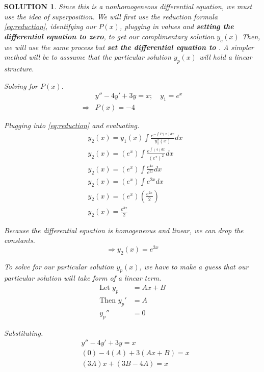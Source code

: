 \documentclass{article}
\theoremstyle{solution}
\newtheorem*{solution}{SOLUTION}
\theoremstyle{definition}
\begin{document}
\begin{solution}
    Since this is a nonhomogeneous differential equation, we must use the idea of superposition.
    We will first use the reduction formula \eqref{eq:reduction}, identifying
    our $P(x)$, plugging in values and \textbf{setting the differential equation to zero}, to get our complimentary solution $y_c(x)$ 
    Then, we will use the same process but \textbf{set the differential equation to} {}. A simpler method
    will be to asssume that the particular solution $y_p(x)$ will hold a linear structure.

    Solving for $P(x)$.
    \begin{align*}
                        & y''-4y'+3y=x; \quad y_1 = e^{x} \\ 
        \Longrightarrow & P(x) = - 4
    \end{align*}

    Plugging into \eqref{eq:reduction} and evaluating.
    \begin{align*}
        & y_2(x) = y_1(x) \int \frac{e^{-\int P(x) dx}}{y_{1}^{2}(x)} dx \\
        & y_2(x) = \left(e^{x}\right) \int \frac{e^{\int \left(4\right) dx}}{\left(e^{x}\right)^2} dx \\
        & y_2(x) = \left(e^{x}\right) \int \frac{e^{4x}}{e^{2x}} dx \\
        & y_2(x) = \left(e^{x}\right) \int e^{2x} dx \\
        & y_2(x) = \left(e^{x}\right) \left(\frac{e^{2x}}{2}\right) \\
        & y_2(x) = \frac{e^{3x}}{2}
    \end{align*}

    Because the differential equation is homogeneous and linear, we can drop the constants.
    \begin{equation*}
    \Longrightarrow \boxed{y_2(x) = e^{3x}}
    \end{equation*}

    To solve for our particular solution $y_p(x)$, we have to make a guess that our particular solution will take form of a linear term.
    \begin{align*}
        \text{Let } y_p &= A x + B \\
        \text{Then } y_p' &= A \\
        y_p'' &= 0
    \end{align*}

    Substituting.
    \begin{align*}
        & y''-4y'+3y=x \\
        & (0) - 4(A) + 3(Ax+B) = x\\
        & (3A)x + (3B-4A) = x 
    \end{align*}


\end{solution}
\end{document}
